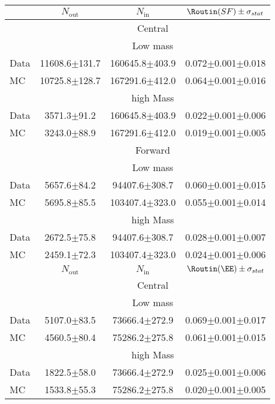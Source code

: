 
\begin{table}[hbtp]
 \renewcommand{\arraystretch}{1.3}
 \setlength{\belowcaptionskip}{6pt}
 \centering
 \caption{
     }
  \label{tab:rOutIn}
\begin{tabular}{l|c|c|c}     
 & $N_{\text{out}}$ & $N_{\text{in}}$ & $ \Routin (SF) \pm \sigma_{stat}$  \\    
\hline
 & \multicolumn{3}{c}{Central} \\
\hline 
 & \multicolumn{3}{c}{Low mass}   \\ 
  Data & 11608.6$\pm$131.7 & 160645.8$\pm$403.9 & 0.072$\pm$0.001$\pm$0.018 \\
 MC & 10725.8$\pm$128.7 & 167291.6$\pm$412.0 & 0.064$\pm$0.001$\pm$0.016 \\

\hline 
& \multicolumn{3}{c}{high Mass} \\ 
\hline
 Data & 3571.3$\pm$91.2 & 160645.8$\pm$403.9 & 0.022$\pm$0.001$\pm$0.006 \\
 MC & 3243.0$\pm$88.9 & 167291.6$\pm$412.0 & 0.019$\pm$0.001$\pm$0.005 \\

 
    \hline 
& \multicolumn{3}{c}{Forward} \\
\hline 
 & \multicolumn{3}{c}{Low mass}   \\ 
  Data & 5657.6$\pm$84.2 & 94407.6$\pm$308.7 & 0.060$\pm$0.001$\pm$0.015 \\
 MC & 5695.8$\pm$85.5 & 103407.4$\pm$323.0 & 0.055$\pm$0.001$\pm$0.014 \\

\hline 
& \multicolumn{3}{c}{high Mass} \\ 
\hline
 Data & 2672.5$\pm$75.8 & 94407.6$\pm$308.7 & 0.028$\pm$0.001$\pm$0.007 \\
 MC & 2459.1$\pm$72.3 & 103407.4$\pm$323.0 & 0.024$\pm$0.001$\pm$0.006 \\

\hline
 & $N_{\text{out}}$ & $N_{\text{in}}$ & $ \Routin (\EE) \pm \sigma_{stat}$  \\    
\hline
 & \multicolumn{3}{c}{Central} \\
\hline 
 & \multicolumn{3}{c}{Low mass}   \\ 
  Data & 5107.0$\pm$83.5 & 73666.4$\pm$272.9 & 0.069$\pm$0.001$\pm$0.017 \\
 MC & 4560.5$\pm$80.4 & 75286.2$\pm$275.8 & 0.061$\pm$0.001$\pm$0.015 \\

\hline 
& \multicolumn{3}{c}{high Mass} \\ 
\hline
 Data & 1822.5$\pm$58.0 & 73666.4$\pm$272.9 & 0.025$\pm$0.001$\pm$0.006 \\
 MC & 1533.8$\pm$55.3 & 75286.2$\pm$275.8 & 0.020$\pm$0.001$\pm$0.005 \\


\end{tabular}
\end{table}
